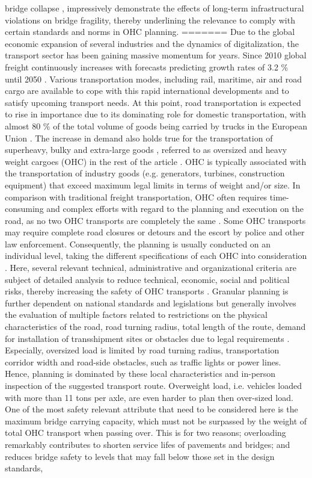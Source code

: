 bridge collapse \cite{Morgese.2020, MorandiNYTimes}, impressively demonstrate the effects of long-term infrastructural violations on bridge fragility, thereby underlining the relevance to comply with certain standards and norms in OHC planning.
=======
Due to the global economic expansion of several industries and the dynamics of digitalization, the transport sector has been gaining massive momentum for years. Since 2010 global freight continuously increases with forecasts predicting growth rates of 3.2 \% until 2050 \cite{figura2020preferences, InternationalTransportForum}. Various transportation modes, including rail, maritime, air and road cargo are available to cope with this rapid international developments and to satisfy upcoming transport needs. At this point, road transportation is expected to rise in importance due to its dominating role for domestic transportation, with almost 80 \% of the total volume of goods being carried by trucks in the European Union \cite{Eurostat}. The increase in demand also holds true for the transportation of superheavy, bulky and extra-large goods \cite{gavrilova2021analysis}, referred to as oversized and heavy weight cargoes (OHC) in the rest of the article \cite{Luo.2021}. OHC is typically associated with the transportation of industry goods (e.g. generators, turbines, construction equipment) that exceed maximum legal limits in terms of weight and/or size. In comparison with traditional freight transportation, OHC often requires time-consuming and complex efforts with regard to the planning and execution on the road, as no two OHC transports are completely the same \cite{Wolnowska.2019}. Some OHC transports may require complete road closures or detours and the escort by police and other law enforcement. Consequently, the planning is usually conducted on an individual level, taking the different specifications of each OHC into consideration \cite{Bazaras.2013}. Here, several relevant technical, administrative and organizational criteria are subject of detailed analysis to reduce technical, economic, social and political risks, thereby increasing the safety of OHC transports \cite{Palsaitis.2012}. Granular planning is further dependent on national standards and legislations but generally involves the evaluation of multiple factors related to restrictions on the physical characteristics of the road, road turning radius, total length of the route, demand for installation of transshipment sites or obstacles due to legal requirements \cite{PETRASKA.2018}. Especially, oversized load is limited by road turning radius, transportation corridor width and road-side obstacles, such as traffic lights or power lines. Hence, planning is dominated by these local characteristics and in-person inspection of the suggested transport route. Overweight load, i.e. vehicles loaded with more than 11 tons per axle, are even harder to plan then over-sized load. One of the most safety relevant attribute that need to be considered here is the maximum bridge carrying capacity, which must not be surpassed by the weight of total OHC transport when passing over. This is for two reasons; overloading remarkably contributes to shorten service lifes of pavements and bridges; and reduces bridge safety to levels that may fall below those set in the design standards, 